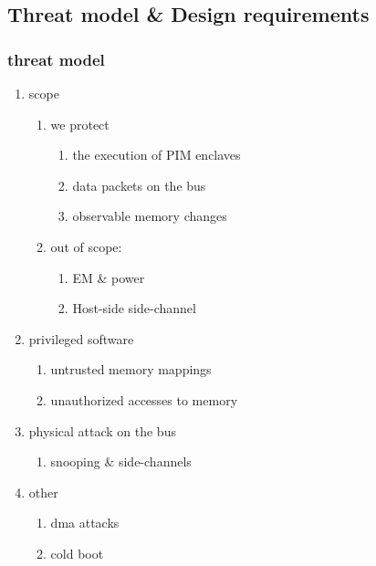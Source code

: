 \documentclass[11pt]{article}
\begin{document}
\subsection{Threat model \& Design requirements}
\label{sec:orgaf4f635}
\subsubsection{threat model}
\label{sec:org298bee3}
\begin{enumerate}
\item scope
\label{sec:org7e9151f}
\begin{enumerate}
\item we protect
\label{sec:org5c6737a}
\begin{enumerate}
\item the execution of PIM enclaves
\label{sec:org4830b9d}
\item data packets on the bus
\label{sec:org45bd952}
\item observable memory changes
\label{sec:org797a609}
\end{enumerate}
\item out of scope:
\label{sec:org4e8bfac}
\begin{enumerate}
\item EM \& power
\label{sec:org25962ef}
\item Host-side side-channel
\label{sec:org750aa49}
\end{enumerate}
\end{enumerate}
\item privileged software
\label{sec:orge65723c}
\begin{enumerate}
\item untrusted memory mappings
\label{sec:orgde470d2}
\item unauthorized accesses to memory
\label{sec:orge054211}
\end{enumerate}
\item physical attack on the bus
\label{sec:org43d24dc}
\begin{enumerate}
\item snooping \& side-channels
\label{sec:org0aac69d}
\end{enumerate}
\item other
\label{sec:org6e8f99d}
\begin{enumerate}
\item dma attacks
\label{sec:orgcbbf085}
\item cold boot
\label{sec:org989e357}
\end{enumerate}
\end{enumerate}
\end{document}
